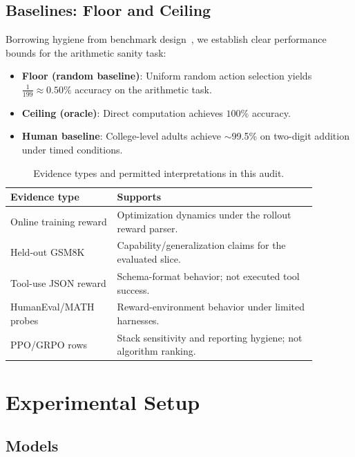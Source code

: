\subsection{Baselines: Floor and Ceiling}

Borrowing hygiene from benchmark design~\cite{agarwal2021deep}, we establish
clear performance bounds for the arithmetic sanity task:

\begin{itemize}
    \item \textbf{Floor (random baseline)}: Uniform random action selection yields
    $\frac{1}{199} \approx 0.50\%$ accuracy on the arithmetic task.
    \item \textbf{Ceiling (oracle)}: Direct computation achieves $100\%$ accuracy.
    \item \textbf{Human baseline}: College-level adults achieve $\sim$99.5\% on
    two-digit addition under timed conditions.
\end{itemize}

\begin{table}[htbp]
\centering
\caption{Evidence types and permitted interpretations in this audit.}
\label{tab:evidence_types}
\small
\begin{tabular}{@{}p{0.30\linewidth}p{0.58\linewidth}@{}}
\toprule
\textbf{Evidence type} & \textbf{Supports}\\
\midrule
Online training reward & Optimization dynamics under the rollout reward parser.\\
Held-out GSM8K & Capability/generalization claims for the evaluated slice.\\
Tool-use JSON reward & Schema-format behavior; not executed tool success.\\
HumanEval/MATH probes & Reward-environment behavior under limited harnesses.\\
PPO/GRPO rows & Stack sensitivity and reporting hygiene; not algorithm ranking.\\
\bottomrule
\end{tabular}
\end{table}

\section{Experimental Setup}
\label{sec:setup}

\subsection{Models}

